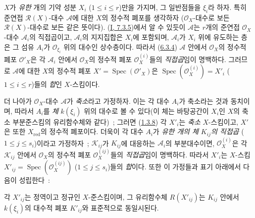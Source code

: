 \begin{env}[6.3.6]
\label{II.6.3.6-ko}
$X$가 \emph{유한} 개의 기약 성분 $X_i$ ($1\leq i\leq r$)만을 가지며, 그
일반점들을 $\xi_i$라 하자. 특히 준연접 $\mathcal{R}(X)$-대수
$\mathcal{A}$에 대한 $X$의 정수적 폐포를 생각하자
($\mathcal{O}_X$-대수로 보든 $\mathcal{R}(X)$-대수로 보든 같은
뜻이다). (\hyperref[I.7.3.5-ko]{I, 7.3.5})에서 알 수 있듯이
$\mathcal{A}$는 $r$개의 준연접 $\mathcal{O}_X$-대수
$\mathcal{A}_i$의 직접곱이고, $\mathcal{A}_i$의 지지집합은 $X_i$에
포함되며, $\mathcal{A}_i$가 $X_i$ 위에 유도하는 층은 그 섬유 $A_i$가
$\mathcal{O}_{\xi_i}$ 위의 대수인 상수층이다. 따라서
(\hyperref[II.6.3.4-ko]{6.3.4}) $\mathcal{A}$ 안에서
$\mathcal{O}_X$의 정수적 폐포 $\mathcal{O}'_X$은 각
$\mathcal{A}_i$ 안에서 $\mathcal{O}_X$의 정수적 폐포
$\mathcal{O}^{(i)}_X$들의 \emph{직접곱}임이 명백하다. 그러므로
$\mathcal{A}$에 대한 $X$의 정수적 폐포
$X'=\operatorname{Spec}(\mathcal{O}'_X)$은
$\operatorname{Spec}(\mathcal{O}^{(i)}_X)=X'_i$ ($1\leq i\leq r$)들의
\emph{합}인 $X$-스킴이다.

더 나아가 $\mathcal{O}_X$-대수 $\mathcal{A}$가 \emph{축소}라고
가정하자. 이는 각 대수 $A_i$가 축소라는 것과 동치이며, 따라서
$A_i$를 \emph{체} $k(\xi_i)$ 위의 대수로 볼 수 있다(이 체는
바탕공간이 $X_i$인 $X$의 축소 부분준스킴의 유리함수체와 같다)~;
그러면 (\hyperref[II.1.3.8-ko]{1.3.8}) 각 $X'_i$는 \emph{축소}
$X$-스킴이고, $X'$은 또한 $X_{\mathrm{red}}$의 정수적 폐포이다. 더욱이
각 대수 $A_i$가 \emph{유한 개의 체 $K_{ij}$의 직접곱}
($1\leq j\leq s_i$)이라고 가정하자~; $\mathcal{K}_{ij}$가
$K_{ij}$에 대응하는 $\mathcal{A}_i$의 부분대수이면,
$\mathcal{O}^{(i)}_X$은 각 $\mathcal{K}_{ij}$ 안에서
$\mathcal{O}_X$의 정수적 폐포 $\mathcal{O}^{(ij)}_X$들의
\emph{직접곱}임이 명백하다. 따라서 $X'_i$는 $X$-스킴
$X'_{ij}=\operatorname{Spec}(\mathcal{O}^{(ij)}_X)$
($1\leq j\leq s_i$)들의 \emph{합}이다. 또한 이 가정들과 표기 아래에서
다음이 성립한다~:
\end{env}


\begin{proposition}[6.3.7]
\label{II.6.3.7-ko}
각 $X'_{ij}$는 정역이고 정규인 $X$-준스킴이며, 그 유리함수체
$R(X'_{ij})$는 $K_{ij}$ 안에서 $k(\xi_i)$의 대수적 폐포 $K'_{ij}$와
표준적으로 동일시된다.
\end{proposition}

